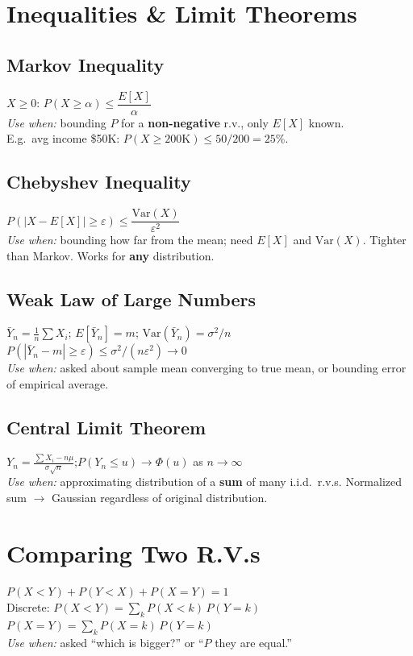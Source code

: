 \documentclass[10pt]{article}
\begin{document}
\begin{multicols*}{2}
\section{Inequalities \& Limit Theorems}

\subsection{Markov Inequality}
$X \ge 0$: \; $\boxed{P(X \ge \alpha) \le \dfrac{E[X]}{\alpha}}$ \\
\textit{Use when:} bounding $P$ for a \textbf{non-negative} r.v., only $E[X]$ known. \\
E.g.\ avg income \$50K: $P(X \ge 200\text{K}) \le 50/200 = 25\%$.

\subsection{Chebyshev Inequality}
$\boxed{P(|X - E[X]| \ge \varepsilon) \le \dfrac{\text{Var}(X)}{\varepsilon^2}}$ \\
\textit{Use when:} bounding how far from the mean; need $E[X]$ and $\text{Var}(X)$. Tighter than Markov. Works for \textbf{any} distribution.

\subsection{Weak Law of Large Numbers}
$\bar{Y}_n = \frac{1}{n}\sum X_i$;\; $E[\bar{Y}_n] = m$;\; $\text{Var}(\bar{Y}_n) = \sigma^2/n$ \\
$P(|\bar{Y}_n - m| \ge \varepsilon) \le \sigma^2/(n\varepsilon^2) \to 0$ \\
\textit{Use when:} asked about sample mean converging to true mean, or bounding error of empirical average.

\subsection{Central Limit Theorem}
$Y_n = \frac{\sum X_i - n\mu}{\sigma\sqrt{n}}$;\quad $P(Y_n \le u) \to \Phi(u)$ as $n \to \infty$ \\
\textit{Use when:} approximating distribution of a \textbf{sum} of many i.i.d.\ r.v.s. Normalized sum $\to$ Gaussian regardless of original distribution.

\section{Comparing Two R.V.s}
$P(X < Y) + P(Y < X) + P(X = Y) = 1$ \\
Discrete: $P(X < Y) = \sum_k P(X < k)\,P(Y\!=\!k)$ \\
$P(X = Y) = \sum_k P(X\!=\!k)\,P(Y\!=\!k)$ \\
\textit{Use when:} asked ``which is bigger?'' or ``$P$ they are equal.''


\end{multicols*}
\end{document}
